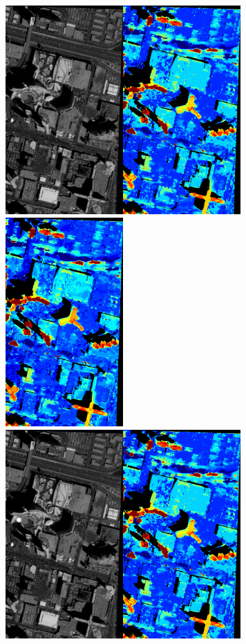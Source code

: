 \documentclass{article}
\theoremstyle{definition}
\begin{document}
\begin{figure}[ht]
 \centering
 \includegraphics[height=8cm]{images/SkysatLR01_120/1521737975374_dmap_050.png}\hspace{-0.28em}
 \includegraphics[height=8cm]{images/SkysatLR01_240/1521738847855_dmap_050.png}\\
 \vspace{1em}
 \includegraphics[height=8cm]{images/SkysatLR01_120/1521737975374_dmap_025.png}\hspace{-0.28em}

\end{figure}
\end{document}
